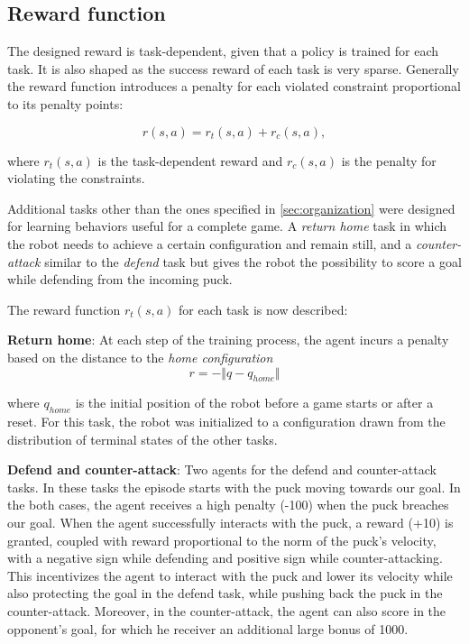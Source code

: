 \subsection{Reward function}
\label{subseq:reward}
The designed reward is task-dependent, given that a policy is trained for each task. It is also shaped as the success reward of each task is very sparse.
Generally the reward function introduces a penalty for each violated constraint proportional to its penalty points:

\begin{equation*}
    r(s,a) = r_t(s,a) + r_c(s,a),
\end{equation*}

where $r_t(s,a)$ is the task-dependent reward and $r_c(s,a)$ is the penalty for violating the constraints.

Additional tasks other than the ones specified in \ref{sec:organization} were designed for learning behaviors useful for a complete game. A \textit{return home} task in which the robot needs to achieve a certain configuration and remain still,
and a \textit{counter-attack} similar to the \textit{defend} task but gives the robot the possibility to score a goal while defending from the incoming puck.

The reward function $r_t(s,a)$ for each task is now described:

\textbf{Return home}: At each step of the training process, the agent incurs a penalty based on the distance to the \textit{home configuration}
\begin{equation*}
    r = - \Vert q - q_{home} \Vert
\end{equation*}

where $q_{home}$ is the initial position of the robot before a game starts or after a reset. For this task, the robot was initialized to a configuration
drawn from the distribution of terminal states of the other tasks.

\textbf{Defend and counter-attack}: 
Two agents for the defend and counter-attack tasks. In these
tasks the episode starts with the puck moving towards our goal. In the both cases, the agent receives a
high penalty (-100) when the puck breaches our goal. When the agent successfully interacts with the
puck, a reward (+10) is granted, coupled with reward proportional to the norm of the puck's velocity,
with a negative sign while defending and positive sign while counter-attacking. This incentivizes the
agent to interact with the puck and lower its velocity while also protecting the goal in the defend task,
while pushing back the puck in the counter-attack. Moreover, in the counter-attack, the agent can also
score in the opponent's goal, for which he receiver an additional large bonus of 1000.

